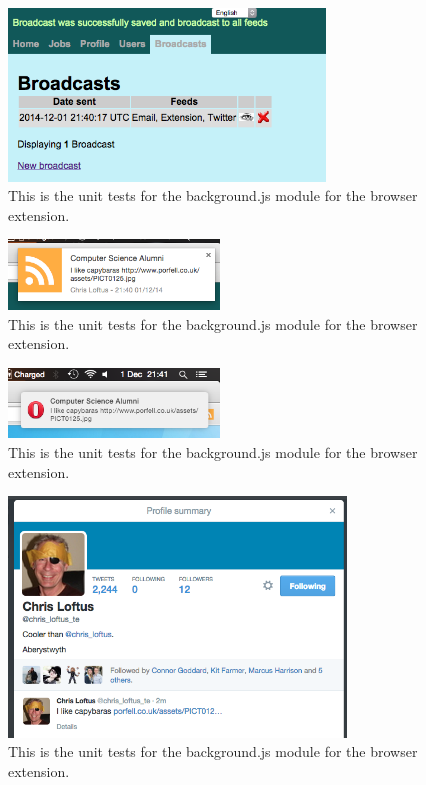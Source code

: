 \documentclass{article}
\begin{document}
\begin{figure}[!htbp]
\centering
\includegraphics[width=0.75\textwidth]{confbc}
\caption{This is the unit tests for the background.js module for the browser extension.}
\end{figure}

\begin{figure}[!htbp]
\centering
\includegraphics[width=0.5\textwidth]{chromenotification}
\caption{This is the unit tests for the background.js module for the browser extension.}
\end{figure}

\begin{figure}[!htbp]
\centering
\includegraphics[width=0.5\textwidth]{operanotification}
\caption{This is the unit tests for the background.js module for the browser extension.}
\end{figure}

\begin{figure}[!htbp]
\centering
\includegraphics[width=0.8\textwidth]{twitterbc}
\caption{This is the unit tests for the background.js module for the browser extension.}
\end{figure}
\end{document}
